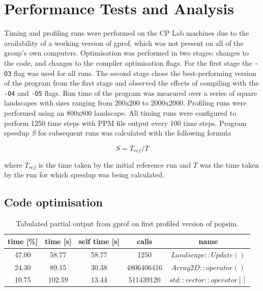\section{Performance Tests and Analysis}
\label{Performance Tests and Analysis}

Timing and profiling runs were performed on the CP Lab machines due to the availability of a working version of gprof, which was not present on all of the group's own computers.
Optimisation was performed in two stages: changes to the code, and changes to the compiler optimisation flags.  For the first stage the \texttt{-O3} flag was used for all runs.  The second stage chose the best-performing version of the program from the first stage and observed the effects of compiling with the \texttt{-O4} and \texttt{-O5} flags.
Run time of the program was measured over a series of square landscapes with sizes ranging from 200x200 to 2000x2000.
Profiling runs were performed using an 800x800 landscape.
All timing runs were configured to perform 1250 time steps with PPM file output every 100 time steps.
Program speedup \textit{S} for subsequent runs was calculated with the following formula

\begin{equation}
S = T_{ref} / T
\label{equation:speedup}
\end{equation}

where $T_{ref}$ is the time taken by the initial reference run and ${T}$ was the time taken by the run for which speedup was being calculated.


\subsection{Code optimisation}
\label{Code optimisation}

\begin{table}[h!]
\caption{Tabulated partial output from gprof on first profiled version of popsim.}
\label{tab:profile1}
\begin{center}
\begin{tabular}{|c|c|c|c|c|}
\hline
time [\%] & time [s] & self time [s] & calls & name\\
\hline
47.00 & 58.77 & 58.77 & 1250 & $Landscape::Update()$\\
\hline
24.30 & 89.15 & 30.38& 4806406416 & $Array2D::operator()$\\
\hline
10.75& 102.59 & 13.44 & 511439120 & $std::vector::operator[]$\\
\hline
\end{tabular}
\end{center}
\end{table}

